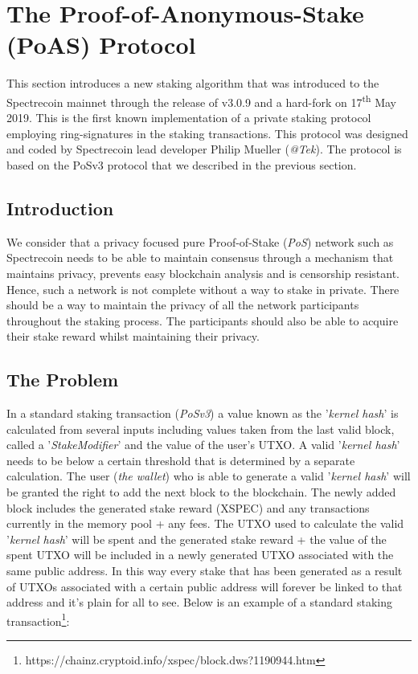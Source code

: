 \section{The Proof-of-Anonymous-Stake (PoAS) Protocol}
This section introduces a new staking algorithm that was introduced to the
Spectrecoin mainnet through the release of v3.0.9 and a hard-fork on
17\textsuperscript{th} May 2019. This is the first known implementation
of a private staking protocol employing ring-signatures in the staking
transactions. This protocol was designed and coded by Spectrecoin lead
developer Philip Mueller (\textit{@Tek}). The protocol is based on the
PoSv3 protocol that we described in the previous section.



\subsection{Introduction}
We consider that a privacy focused pure Proof-of-Stake (\textit{PoS})
network such as Spectrecoin needs to be able to maintain consensus through
a mechanism that maintains privacy, prevents easy blockchain analysis and
is censorship resistant. Hence, such a network is not complete without a
way to stake in private. There should be a way to maintain the privacy of
all the network participants throughout the staking process. The
participants should also be able to acquire their stake reward whilst
maintaining their privacy.



\subsection{The Problem}

In a standard staking transaction (\textit{PoSv3}) a value known as the
'\textit{kernel hash}' is calculated from several inputs including values
taken from the last valid block, called a '\textit{StakeModifier}' and
the value of the user's UTXO. A valid '\textit{kernel hash}' needs to be
below a certain threshold that is determined by a separate calculation.
The user (\textit{the wallet}) who is able to generate a valid
'\textit{kernel hash}' will be granted the right to add the next block
to the blockchain. The newly added block includes the generated stake
reward (XSPEC) and any transactions currently in the memory pool + any
fees. The UTXO used to calculate the valid '\textit{kernel hash}' will
be spent and the generated stake reward + the value of the spent UTXO
will be included in a newly generated UTXO associated with the same public
address. In this way every stake that has been generated as a result of
UTXOs associated with a certain public address will forever be linked to
that address and it's plain for all to see. Below is an example of a
standard staking transaction\footnote{https://chainz.cryptoid.info/xspec/block.dws?1190944.htm}:



